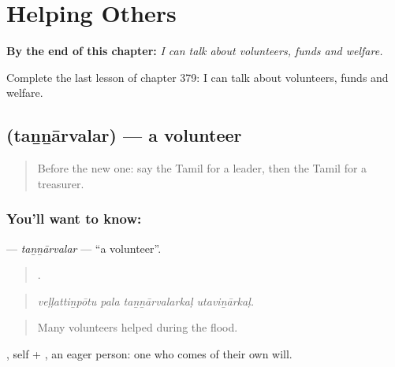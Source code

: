 
\chapter{Helping Others}
\label{ch:ta-helping-others}

\begin{chapteropening}
\textbf{By the end of this chapter:} \emph{I can talk about volunteers, funds and welfare.}

Complete the last lesson of chapter 379: I can talk about volunteers, funds and welfare.
\end{chapteropening}

\section[\texorpdfstring{\ta{தன்னார்வலர்} (taṉṉārvalar)}{தன்னார்வலர் (taṉṉārvalar)}]{ (taṉṉārvalar) — a volunteer}

\label{lesson:TA-C379-tannarvalar}



\begin{quote}
Before the new one: say the Tamil for a leader, then the Tamil for a treasurer.
\end{quote}

\subsection*{You'll want to know: }
\textbf{} — \emph{taṉṉārvalar} — \textquotedblleft{}a volunteer\textquotedblright{}.

\begin{quote}
   .
\end{quote}

\begin{quote}
\emph{veḷḷattiṉpōtu pala taṉṉārvalarkaḷ utaviṉārkaḷ.}
\end{quote}

\begin{quote}
Many volunteers helped during the flood.
\end{quote}

, self + , an eager person: one who comes of their own will.

